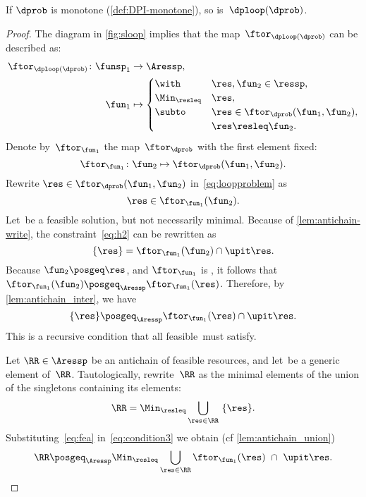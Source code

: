 \begin{proposition}
  \label{pro:loop-continuous}If $\dprob$ is monotone (\cref{def:DPI-monotone}),
  so is~$\dploop(\dprob)$.
\end{proposition}
\begin{proof}
  The diagram in \cref{fig:sloop} implies that the map~$\ftor_{\dploop(\dprob)}$
  can be described as:
  \begin{align}
    \ftor_{\dploop(\dprob)}\colon\funsp_{1} & \rightarrow\Aressp,\label{eq:loopproblem}\\
    \fun_{1} & \mapsto\begin{cases}
                        \with & \res,\fun_{2}\in\ressp,\\
                        \Min_{\resleq} & \res,\\
                        \subto & \res\in\ftor_{\dprob}(\fun_{1},\fun_{2}),\\
                        & \res\resleq\fun_{2}.
    \end{cases}
  \end{align}
  Denote by~$\ftor_{\fun_{1}}$ the map~$\ftor_{\dprob}$ with the
  first element fixed:
  \[
    \ftor_{\fun_{1}}\colon\fun_{2}\mapsto\ftor_{\dprob}(\fun_{1},\fun_{2}).
  \]
  Rewrite $\res\in\ftor_{\dprob}(\fun_{1},\fun_{2})$ in~\cref{eq:loopproblem}
  as
  \begin{equation}
    \res\in\ftor_{\fun_{1}}(\fun_{2}).\label{eq:h2}
  \end{equation}
  Let~\res be a feasible solution, but not necessarily minimal.
  Because of \cref{lem:antichain-write}, the constraint~\cref{eq:h2} can
  be rewritten as
  \begin{equation}
    \{\res\}=\ftor_{\fun_{1}}(\fun_{2})\cap\upit\res.\label{eq:h3}
  \end{equation}
  Because $\fun_{2}\posgeq\res$, and $\ftor_{\fun_{1}}$ is \scottcontinuous,
  it follows that~$\ftor_{\fun_{1}}(\fun_{2})\posgeq_{\Aressp}\ftor_{\fun_{1}}(\res)$.
  Therefore, by \cref{lem:antichain_inter}, we have
  \begin{equation}
    \{\res\}\posgeq_{\Aressp}\ftor_{\fun_{1}}(\res)\cap\upit\res.\label{eq:fea}
  \end{equation}
  This is a recursive condition that all feasible~\res must satisfy.

  Let $\RR\in\Aressp$ be an antichain of feasible resources, and
  let~\res be a generic element of~$\RR$. Tautologically, rewrite~$\RR$
  as the minimal elements of the union of the singletons containing
  its elements:
  \begin{equation}
    \RR=\Min_{\resleq}\bigcup_{\res\in\RR}\ \{\res\}.\label{eq:condition3}
  \end{equation}
  Substituting~\cref{eq:fea} in~\cref{eq:condition3} we obtain (cf
  \cref{lem:antichain_union})
  \begin{equation}
    \RR\posgeq_{\Aressp}\Min_{\resleq}\bigcup_{\res\in\RR}\ftor_{\fun_{1}}(\res)\ \cap\ \upit\res.\label{eq:recursive}
  \end{equation}


\end{proof}
